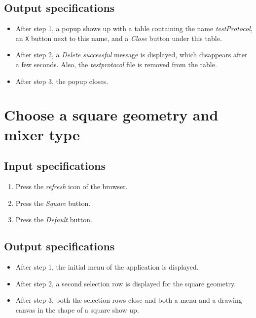 \subsection*{Output specifications}
\begin{itemize}
\item After step 1, a popup shows up with a table containing the name \emph{testProtocol}, an \texttt{X} button next to this name, and a \emph{Close} button under this table.
\item After step 2, a \emph{Delete successful} message is displayed, which disappears after a few seconds. Also, the \emph{testprotocol} file is removed from the table.
\item After step 3, the popup closes.
\end{itemize}

\section{Choose a square geometry and mixer type}

\subsection*{Input specifications}
\begin{enumerate}
\item Press the \emph{refresh} icon of the browser.
\item Press the \emph{Square} button.
\item Press the \emph{Default} button.
\end{enumerate}

\subsection*{Output specifications}
\begin{itemize}
\item After step 1, the initial menu of the application is displayed.
\item After step 2, a second selection row is displayed for the square geometry.
\item After step 3, both the selection rows close and both a menu and a drawing canvas in the shape of a square show up.
\end{itemize}

